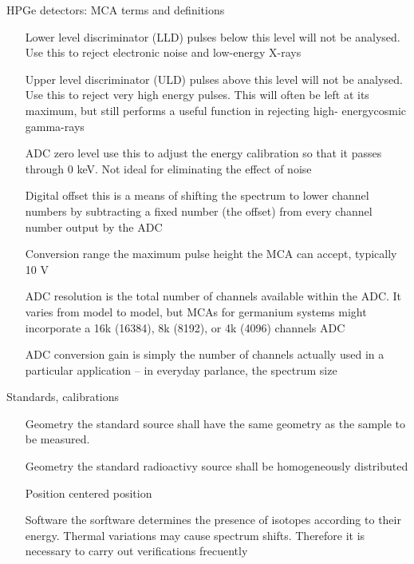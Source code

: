 \begin{frame}{HPGe detectors: MCA terms and definitions}

\begin{flushright}


\begin{minipage}{0.7\textwidth}
{\scriptsize 
\begin{itemize}
\item[Lower level discriminator (LLD)] pulses below this level will not be analysed. Use this to reject electronic noise and low-energy X-rays
\item [Upper level discriminator (ULD)] pulses above this level will not be analysed. Use this to reject very high energy pulses. This will often be left at its maximum, but still performs a useful function in rejecting high- energycosmic gamma-rays
\item [ADC zero level]  use this to adjust the energy calibration so that it passes through 0 keV. Not ideal for eliminating the effect of noise
\item [Digital offset] this is a means of shifting the spectrum to lower channel numbers by subtracting a fixed number (the offset) from every channel number output by the ADC 
\item [Conversion range] the maximum pulse height the MCA can accept, typically 10 V
\item [ADC resolution] is the total number of channels available within the ADC. It varies from model to model, but MCAs for germanium systems might incorporate a 16k (16384), 8k (8192), or 4k (4096) channels ADC
\item [ADC conversion gain] is simply the number of channels actually used in a particular application – in everyday parlance, the spectrum size
\end{itemize}
}
\end{minipage}
\end{flushright}


\end{frame}

\begin{frame}{Standards, calibrations}

{\small
\begin{itemize}
\item[Geometry] the standard source shall have the same geometry as the sample to be measured. 
\item[Geometry] the standard radioactivy source shall be homogeneously distributed 
\item[Position] centered position
\item[Software] the sorftware determines the presence of isotopes according to their energy. Thermal variations may cause spectrum shifts. Therefore it is necessary to carry out verifications frecuently
\end{itemize}
}

\end{frame}

